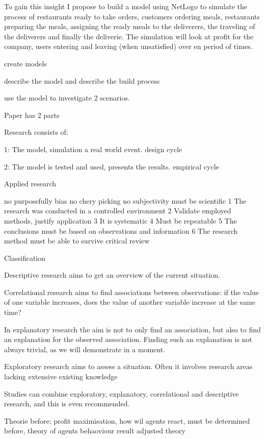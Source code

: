 To gain this insight I propose to build a model using NetLogo to simulate the process of restaurants ready to take orders, customers ordering meals,
restaurants preparing the meals, assigning the ready meals to the deliverers, the traveling of the deliverers and finally the deliverie.
The simulation will look at profit for the company, users entering and leaving (when unsatisfied) over en period of times.


create models

describe the model and describe the build process

use the model to investigate 2 scenarios.



Paper has 2 parts

Research consists of:

1: The model, simulation a real world event. design cycle

2: The model is tested and used, presents the results. empirical cycle

Applied research

no purposefully bias
no chery picking
no subjectivity
must be scientific
1 The research was conducted in a controlled environment
2 Validate employed methods, justify application
3 It is systematic
4 Must be repeatable
5 The conclusions must be based on observations and information
6 The research method must be able to survive critical review

Classification

Descriptive research aims to get an overview of the current situation.

Correlational research aims to find associations between observations: if
the value of one variable increases, does the value of another variable
increase at the same time?

In explanatory research the aim is not to only find an association, but also
to find an explanation for the observed association. Finding such an
explanation is not always trivial, as we will demonstrate in a moment.

Exploratory research aims to assess a situation. Often it involves
research areas lacking extensive existing knowledge

Studies can combine exploratory, explanatory, correlational and
descriptive research, and this is even recommended.

Theorie before: profit maximisation, how wil agents react, must be determined before,
theory of agents behaoviour
result adjusted theory


